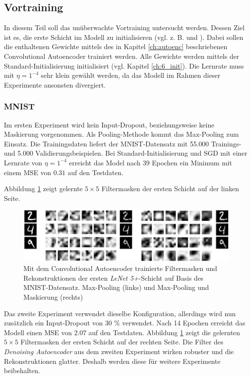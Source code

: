 \subsection{Vortraining}
\label{ch:pretrain} 
In diesem Teil soll das unüberwachte Vortraining untersucht werden. Dessen Ziel ist es, die erste Schicht im Modell zu initialisieren (vgl. z. B. \cite{Ranzato2006} und \cite{Masci2011}). Dabei sollen die enthaltenen Gewichte mittels des in Kapitel \ref{ch:autoenc} beschriebenen Convolutional Autoencoder trainiert werden. Alle Gewichte werden mittels der Standard-Initialisierung initialisiert (vgl. Kapitel \ref{ch:6_init}). Die Lernrate muss mit $\eta = 1^{-4}$ sehr klein gewählt werden, da das Modell im Rahmen dieser Experimente ansonsten divergiert. 

\subsubsection{MNIST}
Im ersten Experiment wird kein Input-Dropout, beziehungsweise keine Maskierung vorgenommen. Als Pooling-Methode kommt das Max-Pooling zum Einsatz. Die Trainingsdaten liefert der MNIST-Datensatz mit 55.000 Trainings- und 5.000 Validierungsbeispielen.
Bei Standard-Initialisierung und SGD mit einer Lernrate von $\eta = 1^{-4}$ erreicht das Model nach 39 Epochen ein Minimum mit einem MSE von $0.31$ auf den Testdaten.

Abbildung \ref{fig:6_mnist_autoencoder_combined} zeigt gelernte $5 \times 5$ Filtermasken der ersten Schicht auf der linken Seite.
\begin{figure}[H]
\centering
\includegraphics[width=0.9\linewidth]{images/6_mnist_autoencoder_combined}
\caption[]{Mit dem Convolutional Autoencoder trainierte Filtermasken und Rekonstruktionen der ersten \textit{LeNet 5+}-Schicht auf Basis des MNIST-Datensatz. Max-Pooling (links) und Max-Pooling und Maskierung (rechts)}
\label{fig:6_mnist_autoencoder_combined}
\end{figure}

Das zweite Experiment verwendet dieselbe Konfiguration, allerdings wird nun zusätzlich ein Input-Dropout von 30 \% verwendet.
Nach 14 Epochen erreicht das Modell einen MSE von $2.07$ auf den Testdaten. Abbildung \ref{fig:6_mnist_autoencoder_combined} zeigt die gelernten $5 \times 5$ Filtermasken der ersten Schicht auf der rechten Seite.
Die Filter des \textit{Denoising Autoencoder} aus dem zweiten Experiment wirken robuster und die Rekonstruktionen glatter. Deshalb werden diese für weitere Experimente beibehalten.


